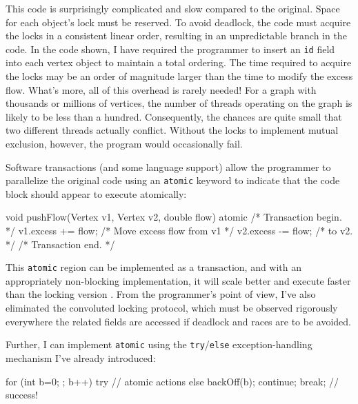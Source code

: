 This code is surprisingly complicated and slow compared to the
original.  Space for each object's lock must be reserved.
To avoid deadlock, the code must acquire the locks in
a consistent linear order, resulting in an unpredictable branch in the
code.  In the code shown,
I have required the programmer to insert an \texttt{id} field into
each vertex object to maintain a total ordering.
The time required to acquire the locks may be
an order of magnitude larger than the time to
modify the excess flow.
What's more, all of this overhead is rarely
needed!  For a graph with thousands or millions of vertices, the
number of threads operating on the graph is likely to be less than a
hundred.  Consequently, the chances are quite small that two different
threads actually conflict.  Without the locks to implement mutual
exclusion, however, the program would occasionally fail.

Software transactions (and some language support) allow the
programmer to parallelize the original code using an \texttt{atomic}
keyword to indicate that the code block should appear to execute
atomically: 
\begin{inlinecode}
void pushFlow(Vertex v1, Vertex v2, double flow) {
  atomic { /* Transaction begin. */
    v1.excess += flow; /* Move excess flow from v1 */
    v2.excess -= flow; /* to v2.                   */
  } /* Transaction end. */
}
\end{inlinecode}

This {\tt atomic} region can be implemented as a transaction, and
with an appropriately non-blocking implementation, it
will scale better and execute faster than the locking version
\cite{AnanianAsKuLeLi04,HarrisFr03,GreenwaldCh96,MassalinPu91,HerlihyMo93,ShavitTo95}.
From the programmer's point of view, I've also eliminated the
convoluted locking protocol, which must
be observed rigorously everywhere the related fields are accessed if
deadlock and races are to be avoided.

Further, I can implement {\tt atomic} using the {\tt try}/{\tt else}
exception-handling mechanism I've already introduced:
\begin{inlinecode}
for (int b=0; ; b++) {
  try {
    // atomic actions
  } else {
    backOff(b);
    continue;
  }
  break; // success!
}
\end{inlinecode}

